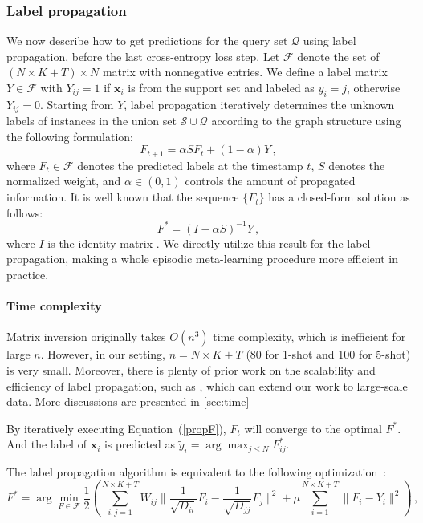 \documentclass{article} \usepackage{iclr2019_conference,times}
\def\bfx{\mathbf{x}}
\begin{document}
\subsubsection{Label propagation}
\label{lp}
We now describe how to get predictions for the query set $\mathcal{Q}$ using label propagation, before the last cross-entropy loss step. Let $\mathcal{F}$ denote the set of $(N\times K+T)\times N$ matrix with nonnegative entries.  We define a label matrix $Y \in \mathcal{F}$ with $Y_{ij}=1$ if $\bfx_i$ is from the support set and labeled as $y_i=j$, otherwise $Y_{ij}=0$. Starting from $Y$, label propagation iteratively determines 
the unknown labels of instances in the union set $\mathcal{S} \cup \mathcal{Q}$ according to the graph structure using the following formulation:
\begin{equation}
    F_{t+1} = \alpha SF_t + (1-\alpha)Y\,, 
\label{eq:lp_iter}
\end{equation}
where $F_{t} \in \mathcal{F}$ denotes the predicted labels at the timestamp $t$, 
$S$ denotes the normalized weight, and $\alpha \in (0,1)$ controls the amount of propagated information. It is well known that the sequence $\{F_{t}\}$ has a closed-form solution as follows:
\begin{equation}
	F^* = (I-\alpha S)^{-1}Y\,,
\label{eq:lp_closed}
\end{equation}
where $I$ is the identity matrix \citep{labelprop1}. We directly utilize this result for the label propagation, making a whole
episodic meta-learning procedure more efficient in practice. 

\paragraph{Time complexity} Matrix inversion originally takes $O(n^3)$ time complexity, which is inefficient for large $n$. However, in our setting, $n=N\times K+T$ (80 for 1-shot and 100 for 5-shot) is very small. Moreover, there is plenty of prior work on the scalability and efficiency of label propagation, such as \cite{scale1,scale2}, which can extend our work to large-scale data. More discussions are presented in \ref{sec:time}

\if
By iteratively executing Equation~(\ref{propF}), $F_t$ will converge to the optimal $F^*$. And the label of $\bfx_i$ is predicted as $\tilde{y}_i = \arg\max_{j\leq N}F^*_{ij}$.

The label propagation algorithm is equivalent to the following optimization~\citep{labelprop1}:
\begin{equation}
\label{objF}
	F^* = \arg\min_{F\in\mathcal{F}} \frac{1}{2}\left( \sum_{i,j=1}^{N\times K+T}W_{ij}\|\frac{1}{\sqrt{D_{ii}}} F_i - \frac{1}{\sqrt{D_{jj}}} F_j \|^2 + \mu \sum_{i=1}^{N\times K+T} \|F_i-Y_i\|^2\right)\,,
\end{equation}
\end{document}

